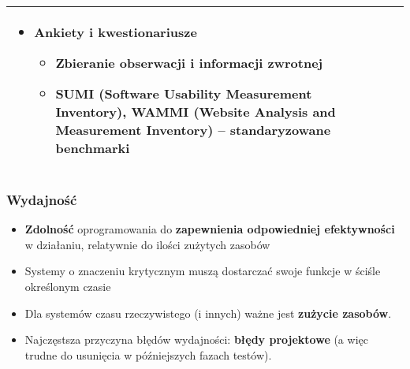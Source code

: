 \documentclass[../main.tex]{subfiles}
\begin{document}
\begin{table}[H]
\begin{center}
\begin{tabular}{| p{8cm} | p{8cm} |}
\begin{itemize}
                    \item \textbf{Ankiety i kwestionariusze}
                    \begin{itemize}
                        \item Zbieranie \textbf{obserwacji} i \textbf{informacji zwrotnej}
                        \item \textbf{SUMI} (Software Usability Measurement Inventory), \textbf{WAMMI} (Website Analysis and Measurement Inventory)
                        – standaryzowane benchmarki
                    \end{itemize}
                \end{itemize}\\
                \hline
            \end{tabular}
        \end{center}
    \end{table}


    \subsubsection{Wydajność}
    \begin{itemize}
        \item \textbf{Zdolność} oprogramowania do \textbf{zapewnienia odpowiedniej efektywności} w działaniu, relatywnie do
        ilości zużytych zasobów
        \item Systemy o znaczeniu krytycznym muszą dostarczać swoje funkcje w ściśle określonym czasie
        \item Dla systemów czasu rzeczywistego (i innych) ważne jest \textbf{zużycie zasobów}.
        \item Najczęstsza przyczyna błędów wydajności: \textbf{błędy projektowe} (a więc trudne do usunięcia w późniejszych fazach testów).
    \end{itemize}
\end{document}
